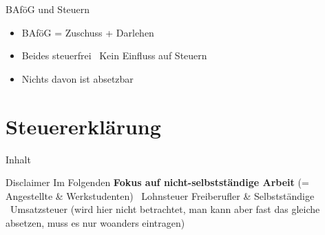 \documentclass{beamer}
\begin{document}
		\begin{frame}{BAföG und Steuern}
			\begin{itemize}
				\item BAföG = Zuschuss + Darlehen
				\item Beides steuerfrei \textrightarrow\ Kein Einfluss auf Steuern
				\item Nichts davon ist absetzbar
			\end{itemize}
		\end{frame}
	
	\section{Steuererklärung}
	
		\begin{frame}[t]{Inhalt}
		\end{frame}
	
		\begin{frame}{Disclaimer}
			Im Folgenden \textbf{Fokus auf nicht-selbstständige Arbeit} (= Angestellte \& Werkstudenten) \textrightarrow\ Lohnsteuer\n\pause\footnotesize
			Freiberufler \& Selbstständige \textrightarrow\ Umsatzsteuer (wird hier nicht betrachtet, man kann aber fast das gleiche absetzen, muss es nur woanders eintragen)
		\end{frame}
	
\end{document}
